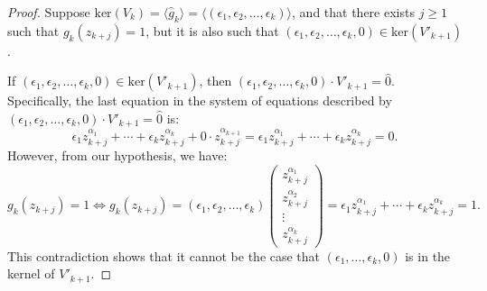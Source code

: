 \documentclass[11pt]{llncs}
\begin{document}
\begin{proof}
	
	    Suppose \( \text{ker}(V_k) = \langle \hat{g}_k \rangle = \langle (\epsilon_1, \epsilon_2, \dots, \epsilon_k) \rangle \), and that there exists \( j \geq 1 \) such that \( g_k(z_{k+j}) = 1 \), but it is also such that \( (\epsilon_1, \epsilon_2, \dots, \epsilon_k, 0) \in \text{ker}(V'_{k+1}) \).

  
If \( (\epsilon_1, \epsilon_2, \dots, \epsilon_k, 0) \in \text{ker}(V'_{k+1}) \), then \( (\epsilon_1, \epsilon_2, \dots, \epsilon_k, 0) \cdot V'_{k+1} = \hat{0} \). Specifically, the last equation in the system of equations described by \( (\epsilon_1, \epsilon_2, \dots, \epsilon_k, 0) \cdot V'_{k+1} = \hat{0} \) is:
   \[
\epsilon_1 z_{k+j}^{\alpha_1} + \cdots + \epsilon_k z_{k+j}^{\alpha_k} + 0 \cdot z_{k+j}^{\alpha_{k+1}} = \epsilon_1 z_{k+j}^{\alpha_1} + \cdots + \epsilon_k z_{k+j}^{\alpha_k} = 0.
\]
However, from our hypothesis, we have:
\[
g_k(z_{k+j}) = 1 \iff g_k(z_{k+j}) = 
(\epsilon_1, \epsilon_2, \dots, \epsilon_k)
\begin{pmatrix}
z_{k+j}^{\alpha_1} \\
z_{k+j}^{\alpha_2} \\
\vdots \\
z_{k+j}^{\alpha_k}
\end{pmatrix}
= \epsilon_1 z_{k+j}^{\alpha_1} + \cdots + \epsilon_k z_{k+j}^{\alpha_k} = 1.
\]
This contradiction shows that it cannot be the case that \( (\epsilon_1, \dots, \epsilon_k, 0) \) is in the kernel of \( V'_{k+1} \).   

\end{proof}
\end{document}
